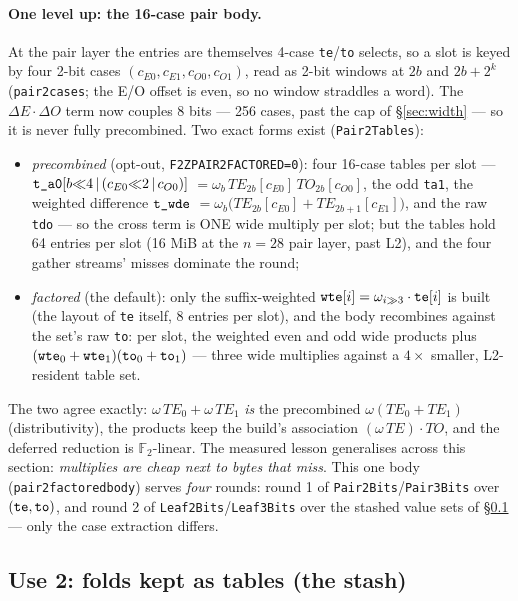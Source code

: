 \documentclass[11pt]{article}
\newcommand{\F}{\mathbb{F}}
\newcommand{\Ftwo}{\F_2}
\newcommand{\code}[1]{{\def\_{\textunderscore\allowbreak}\texttt{#1}}}
\theoremstyle{definition}
\begin{document}
\paragraph{One level up: the 16-case pair body.}
At the pair layer the entries are themselves 4-case
\code{te}/\code{to} selects, so a slot is keyed by four 2-bit cases
$(c_{E0}, c_{E1}, c_{O0}, c_{O1})$, read as 2-bit windows at $2b$ and
$2b + 2^k$ (\code{pair2\_cases}; the E/O offset is even, so no window
straddles a word).  The $\Delta E\cdot\Delta O$ term now couples
8 bits --- 256 cases, past the cap of \S\ref{sec:width} --- so it is
never fully precombined.  Two exact forms exist
(\code{Pair2Tables}):
\begin{itemize}[itemsep=2pt]
\item \emph{precombined} (opt-out, \code{F2Z\_PAIR2\_FACTORED=0}):
  four 16-case tables per slot ---
  $\code{t\_a0}[b{\ll}4 \,|\, (c_{E0}{\ll}2 \,|\, c_{O0})]$
  ${} = \omega_b\,TE_{2b}[c_{E0}]\,TO_{2b}[c_{O0}]$, the odd \code{t\_a1},
  the weighted difference $\code{t\_wde}$
  ${} = \omega_b\big(TE_{2b}[c_{E0}] + TE_{2b+1}[c_{E1}]\big)$, and
  the raw \code{t\_do} --- so the cross term
  is ONE wide multiply per slot; but the tables hold 64 entries per
  slot (16 MiB at the $n = 28$ pair layer, past L2), and the four
  gather streams' misses dominate the round;
\item \emph{factored} (the default): only the suffix-weighted
  $\code{wte}[i] = \omega_{i \gg 3}\cdot\code{te}[i]$ is built (the
  layout of \code{te} itself, 8 entries per slot), and the body
  recombines against the set's raw \code{to}: per slot, the weighted
  even and odd wide products plus
  $(\code{wte}_0 + \code{wte}_1)(\code{to}_0 + \code{to}_1)$ ---
  three wide multiplies against a $4\times$ smaller, L2-resident
  table set.
\end{itemize}
The two agree exactly: $\omega\,TE_0 + \omega\,TE_1$ \emph{is} the
precombined $\omega(TE_0 + TE_1)$ (distributivity), the products keep
the build's association $(\omega\,TE)\cdot TO$, and the deferred
reduction is $\Ftwo$-linear.  The measured lesson generalises across
this section: \emph{multiplies are cheap next to bytes that miss}.
This one body (\code{pair2\_factored\_body}) serves \emph{four}
rounds: round 1 of \code{Pair2Bits}/\code{Pair3Bits} over
$(\code{te}, \code{to})$, and round 2 of
\code{Leaf2Bits}/\code{Leaf3Bits} over the stashed value sets of
\S\ref{sec:stash} --- only the case extraction differs.

\subsection{Use 2: folds kept as tables (the stash)}
\label{sec:stash}
\end{document}
